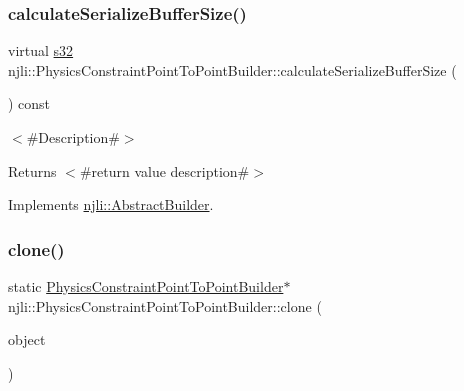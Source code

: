 \mbox{\label{classnjli_1_1_physics_constraint_point_to_point_builder_a3bcefc90855e193d66a5932174b141bc}} 
\subsubsection{\texorpdfstring{calculate\+Serialize\+Buffer\+Size()}{calculateSerializeBufferSize()}}
{\footnotesize\ttfamily virtual \mbox{\hyperlink{_util_8h_aa62c75d314a0d1f37f79c4b73b2292e2}{s32}} njli\+::\+Physics\+Constraint\+Point\+To\+Point\+Builder\+::calculate\+Serialize\+Buffer\+Size (\begin{DoxyParamCaption}{ }\end{DoxyParamCaption}) const\hspace{0.3cm}{\ttfamily [virtual]}}

$<$\#\+Description\#$>$

\begin{DoxyReturn}{Returns}
$<$\#return value description\#$>$ 
\end{DoxyReturn}


Implements \mbox{\hyperlink{classnjli_1_1_abstract_builder_aa1d220053e182c37b31b427499c6eacf}{njli\+::\+Abstract\+Builder}}.

\mbox{\label{classnjli_1_1_physics_constraint_point_to_point_builder_accf99fe85ce75a56451259ff26975c66}} 
\subsubsection{\texorpdfstring{clone()}{clone()}}
{\footnotesize\ttfamily static \mbox{\hyperlink{classnjli_1_1_physics_constraint_point_to_point_builder}{Physics\+Constraint\+Point\+To\+Point\+Builder}}$\ast$ njli\+::\+Physics\+Constraint\+Point\+To\+Point\+Builder\+::clone (\begin{DoxyParamCaption}\item[{const \mbox{\hyperlink{classnjli_1_1_physics_constraint_point_to_point_builder}{Physics\+Constraint\+Point\+To\+Point\+Builder}} \&}]{object }\end{DoxyParamCaption})\hspace{0.3cm}{\ttfamily [static]}}

